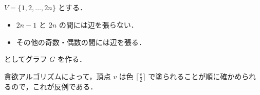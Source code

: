 \subsection{}
$V = \{1,2,\ldots, 2n\}$ とする．
\begin{itemize}
 \item $2n-1$ と $2n$ の間には辺を張らない．
 \item その他の奇数・偶数の間には辺を張る．
\end{itemize}
としてグラフ $G$ を作る．

貪欲アルゴリズムによって，頂点 $v$ は色 $\lceil\frac{v}{2}\rceil$ で塗られることが順に確かめられるので，これが反例である．

